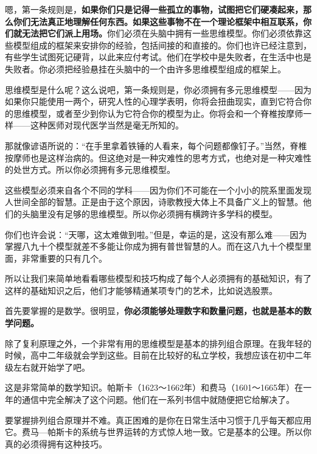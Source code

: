 嗯，第一条规则是，\textbf{如果你们只是记得一些孤立的事物，试图把它们硬凑起来，那么你们无法真正地理解任何东西。如果这些事物不在一个理论框架中相互联系，你们就无法把它们派上用场。}你们必须在头脑中拥有一些思维模型。你们必须依靠这些模型组成的框架来安排你的经验，包括间接的和直接的。你们也许已经注意到，有些学生试图死记硬背，以此来应付考试。他们在学校中是失败者，在生活中也是失败者。你必须把经验悬挂在头脑中的一个由许多思维模型组成的框架上。
\par

思维模型是什么呢？这么说吧，第一条规则是，你必须拥有多元思维模型——因为如果你只能使用一两个，研究人性的心理学表明，你将会扭曲现实，直到它符合你的思维模型，或者至少到你认为它符合你的模型为止。你将会和一个脊椎按摩师一样——这种医师对现代医学当然是毫无所知的。
\par

那就像谚语所说的：“在手里拿着铁锤的人看来，每个问题都像钉子。”当然，脊椎按摩师也是这样治病的。但这绝对是一种灾难性的思考方式，也绝对是一种灾难性的处世方式。所以你必须拥有多元思维模型。
\par

这些模型必须来自各个不同的学科——因为你们不可能在一个小小的院系里面发现人世间全部的智慧。正是由于这个原因，诗歌教授大体上不具备广义上的智慧。他们的头脑里没有足够的思维模型。所以你必须拥有横跨许多学科的模型。
\par

你们也许会说：“天哪，这太难做到啦。”但是，幸运的是，这没有那么难——因为掌握八九十个模型就差不多能让你成为拥有普世智慧的人。而在这八九十个模型里面，非常重要的只有几个。
\par

所以让我们来简单地看看哪些模型和技巧构成了每个人必须拥有的基础知识，有了这样的基础知识之后，他们才能够精通某项专门的艺术，比如说选股票。
\par

首先要掌握的是数学。很明显，\textbf{你必须能够处理数字和数量问题，也就是基本的数学问题。}
\par

除了复利原理之外，一个非常有用的思维模型是基本的排列组合原理。在我年轻的时候，高中二年级就会学到这些。目前在比较好的私立学校，我想应该在初中二年级左右就开始学了吧。
\par

这是非常简单的数学知识。帕斯卡（1623～1662年）和费马（1601～1665年）在一年的通信中完全解决了这个问题。他们在一系列书信中就随便把它给解决了。
\par

要掌握排列组合原理并不难。真正困难的是你在日常生活中习惯于几乎每天都应用它。费马—帕斯卡的系统与世界运转的方式惊人地一致。它是基本的公理。所以你真的必须得拥有这种技巧。
\par

